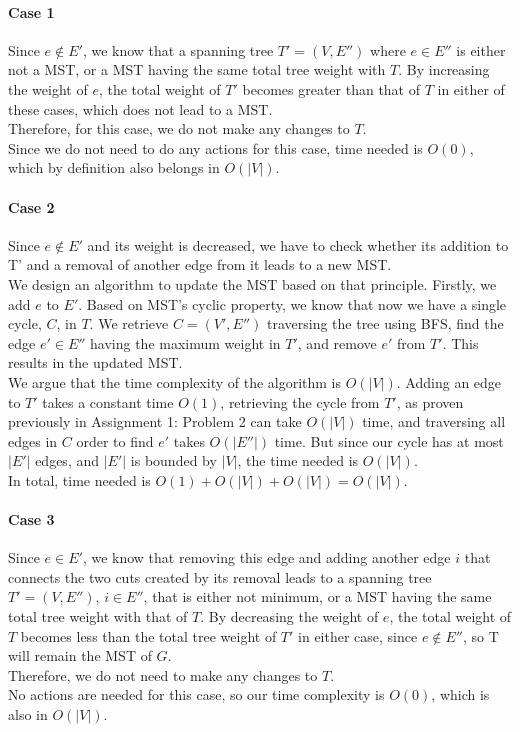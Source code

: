 \documentclass[a4paper,11pt]{article}
\begin{document}
\paragraph{Case 1}
Since $e\notin E'$, we know that a spanning tree $T'=(V,E'')$ where $e\in E''$ is either not a MST, or a MST having the same total tree weight with $T$. By increasing the weight of $e$, the total weight of $T'$ becomes greater than that of $T$ in either of these cases, which does not lead to a MST.\\
Therefore, for this case, we do not make any changes to $T$.\\
Since we do not need to do any actions for this case, time needed is $O(0)$, which by definition also belongs in $O(|V|)$.\\

\paragraph{Case 2}
Since $e\notin E'$ and its weight is decreased, we have to check whether its addition to T' and a removal of another edge from it leads to a new MST.\\
We design an algorithm to update the MST based on that principle. Firstly, we add $e$ to $E'$. Based on MST's cyclic property, we know that now we have a single cycle, $C$, in $T$. We retrieve $C=(V',E'')$ traversing the tree using BFS, find the edge $e'\in E''$ having the maximum weight in $T'$, and remove $e'$ from $T'$. This results in the updated MST.\\
We argue that the time complexity of the algorithm is $O(|V|)$. Adding an edge to $T'$ takes a constant time $O(1)$, retrieving the cycle from $T'$, as proven previously in Assignment 1: Problem 2 can take $O(|V|)$ time, and traversing all edges in $C$ order to find $e'$ takes $O(|E''|)$ time. But since our cycle has at most $|E'|$ edges, and $|E'|$ is bounded by $|V|$, the time needed is $O(|V|)$.\\
In total, time needed is $O(1)+O(|V|)+O(|V|)=O(|V|)$.\\

\paragraph{Case 3}
Since $e \in E'$, we know that removing this edge and adding another edge $i$ that connects the two cuts created by its removal leads to a spanning tree $T'=(V,E'')$, $i\in E''$, that is either not minimum, or a MST having the same total tree weight with that of $T$. By decreasing the weight of $e$, the total weight of $T$ becomes less than the total tree weight of $T'$ in either case, since $e \notin E''$, so T will remain the MST of $G$.\\
Therefore, we do not need to make any changes to $T$.\\
No actions are needed for this case, so our time complexity is $O(0)$, which is also in $O(|V|)$.\\
\end{document}
